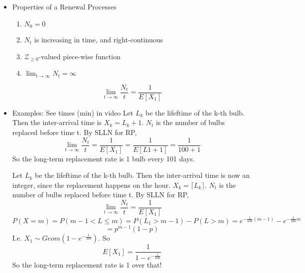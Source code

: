 \documentclass{report}
\begin{document}
\begin{itemize}
{      Generalization of a Renewal process, where the reward is always 1
    }


    \item Properties of a Renewal Processes
      \begin{enumerate}
        \item $N_0 = 0$
        \item $N_t$ is increasing in time, and right-continuous
        \item $\mathcal{Z}_{\geq 0}$-valued piece-wise function
        \item $\lim_{t \to \infty} N_t = \infty$
      \end{enumerate}

       {
          \[ \lim_{t \to \infty} \frac{N_t}{t} = \frac{1}{E[X_1]} \]
      }
      \item Examples: See times (min) in video
        {
          Let $L_k$ be the lifeftime of the k-th bulb.
          Then the inter-arrival time is $X_k = L_k + 1$.  $N_t$ is the
          number of bulbs replaced before time t.  By SLLN for RP,
          \[ \lim_{t \to \infty} \frac{N_t}{t} = \frac{1}{E[X_1]}  
          = \frac{1}{E[L1 + 1]} = \frac{1}{100 + 1} \]
          So the long-term replacement rate is 1 bulb every 101 days.
        }

        {
          Let $L_k$ be the lifeftime of the k-th bulb.
          Then the inter-arrival time is now an integer, since the
          replacement happens on the hour. 
          $X_k = \lceil L_k \rceil$.  $N_t$ is the
          number of bulbs replaced before time t.  By SLLN for RP,
          \[ \lim_{t \to \infty} \frac{N_t}{t} = \frac{1}{E[X_1]}   \]
          \[ P(X=m) = P(m-1 < L \leq m) = P(L_1 > m-1) - P(L > m)
        = e^{-\frac{1}{100}(m-1)} - e^{-\frac{1}{100}m} \]
        \[ = p^{m-1}(1-p) \]
        I.e. $X_1 \sim Geom(1-e^{-\frac{1}{100}})$.
        So
        \[ E[X_1] = \frac{1}{1 - e^{-\frac{1}{100}}}  \]
        So the long-term replacement rate is 1 over that!
        }


\end{itemize}
\end{document}
